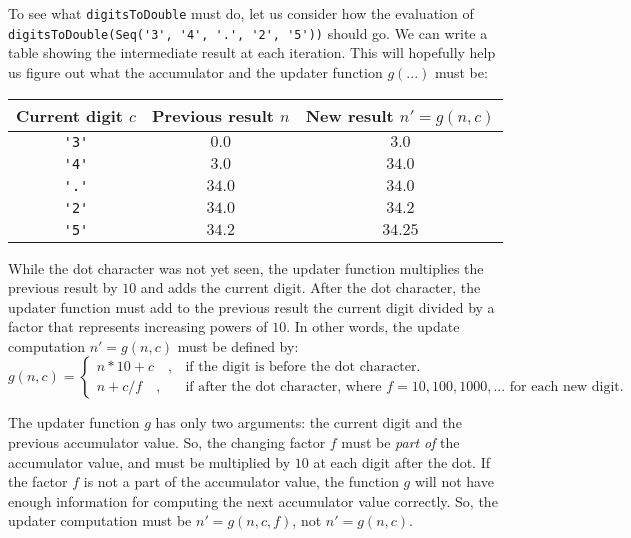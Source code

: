 To see what \lstinline!digitsToDouble! must do, let us consider how
the evaluation of \lstinline!digitsToDouble(Seq('3', '4', '.', '2', '5'))!
should go. We can write a table showing the intermediate result at
each iteration. This will hopefully help us figure out what the accumulator
and the updater function $g(...)$ must be:
\begin{center}
\begin{tabular}{|c|c|c|}
\hline 
\textbf{\small{}Current digit $c$} & \textbf{\small{}Previous result $n$} & \textbf{\small{}New result $n'=g(n,c)$}\tabularnewline
\hline 
\hline 
\lstinline!'3'! & {\small{}$0.0$} & {\small{}$3.0$}\tabularnewline
\hline 
\lstinline!'4'! & {\small{}$3.0$} & {\small{}$34.0$}\tabularnewline
\hline 
\lstinline!'.'! & {\small{}$34.0$} & {\small{}$34.0$}\tabularnewline
\hline 
\lstinline!'2'! & {\small{}$34.0$} & {\small{}$34.2$}\tabularnewline
\hline 
\lstinline!'5'! & {\small{}$34.2$} & {\small{}$34.25$}\tabularnewline
\hline 
\end{tabular}
\par\end{center}

While the dot character was not yet seen, the updater function multiplies
the previous result by $10$ and adds the current digit. After the
dot character, the updater function must add to the previous result
the current digit divided by a factor that represents increasing powers
of $10$. In other words, the update computation $n'=g(n,c)$ must
be defined by:
\[
g(n,c)=\begin{cases}
n*10+c\quad, & \text{if the digit is before the dot character.}\\
n+c/f\quad, & \text{if after the dot character, where }f=10,100,1000,...\text{ for each new digit.}
\end{cases}
\]

The updater function $g$ has only two arguments: the current digit
and the previous accumulator value. So, the changing factor $f$ must
be \emph{part} \emph{of} the accumulator value, and must be multiplied
by $10$ at each digit after the dot. If the factor $f$ is not a
part of the accumulator value, the function $g$ will not have enough
information for computing the next accumulator value correctly. So,
the updater computation must be $n'=g(n,c,f)$, not $n'=g(n,c)$.

